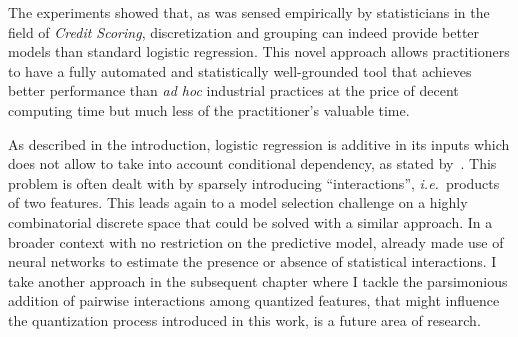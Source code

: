 The experiments showed that, as was sensed empirically by statisticians in the field of \textit{Credit Scoring}, discretization and grouping can indeed provide better models than standard logistic regression. This novel approach allows practitioners to have a fully automated and statistically well-grounded tool that achieves better performance than \textit{ad hoc} industrial practices at the price of decent computing time but much less of the practitioner's valuable time.

As described in the introduction, logistic regression is additive in its inputs which does not allow to take into account conditional dependency, as stated by~\cite{berry2010testing}. This problem is often dealt with by sparsely introducing ``interactions'', \textit{i.e.}\ products of two features. This leads again to a model selection challenge on a highly combinatorial discrete space that could be solved with a similar approach. In a broader context with no restriction on the predictive model, \cite{tsang2018detecting} already made use of neural networks to estimate the presence or absence of statistical interactions. I take another approach in the subsequent chapter where I tackle the parsimonious addition of pairwise interactions among quantized features, that might influence the quantization process introduced in this work, is a future area of research.




\printbibliography[heading=subbibliography, title=References of Chapter 3]

